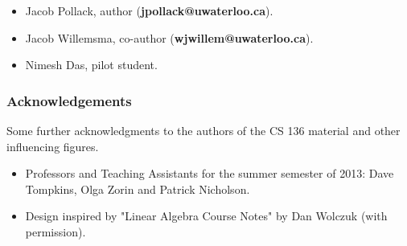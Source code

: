\begin{itemize}

\item Jacob Pollack, author (\textbf{jpollack@uwaterloo.ca}).
\item Jacob Willemsma, co-author (\textbf{wjwillem@uwaterloo.ca}).
\item Nimesh Das, pilot student.

\end{itemize}

\subsubsection*{Acknowledgements}

Some further acknowledgments to the authors of the CS 136 material and other influencing figures.

\begin{itemize}

\item Professors and Teaching Assistants for the summer semester of 2013: Dave Tompkins, Olga Zorin and Patrick Nicholson.
\item Design inspired by "Linear Algebra Course Notes" by Dan Wolczuk (with permission).

\end{itemize}

